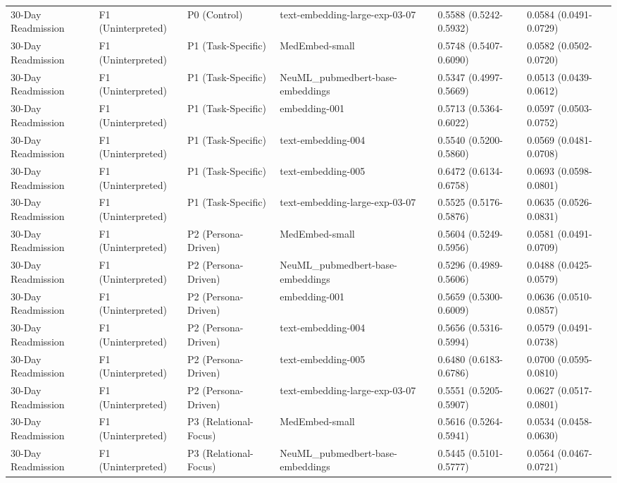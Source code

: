 \documentclass[border=0pt]{standalone}
\begin{document}
\begin{adjustbox}{width=\textwidth}
\begin{tabular}{llllll}
30-Day Readmission & F1 (Uninterpreted) & P0 (Control) & text-embedding-large-exp-03-07 & 0.5588 (0.5242-0.5932) & 0.0584 (0.0491-0.0729) \\
30-Day Readmission & F1 (Uninterpreted) & P1 (Task-Specific) & MedEmbed-small & 0.5748 (0.5407-0.6090) & 0.0582 (0.0502-0.0720) \\
30-Day Readmission & F1 (Uninterpreted) & P1 (Task-Specific) & NeuML\_pubmedbert-base-embeddings & 0.5347 (0.4997-0.5669) & 0.0513 (0.0439-0.0612) \\
30-Day Readmission & F1 (Uninterpreted) & P1 (Task-Specific) & embedding-001 & 0.5713 (0.5364-0.6022) & 0.0597 (0.0503-0.0752) \\
30-Day Readmission & F1 (Uninterpreted) & P1 (Task-Specific) & text-embedding-004 & 0.5540 (0.5200-0.5860) & 0.0569 (0.0481-0.0708) \\
30-Day Readmission & F1 (Uninterpreted) & P1 (Task-Specific) & text-embedding-005 & 0.6472 (0.6134-0.6758) & 0.0693 (0.0598-0.0801) \\
30-Day Readmission & F1 (Uninterpreted) & P1 (Task-Specific) & text-embedding-large-exp-03-07 & 0.5525 (0.5176-0.5876) & 0.0635 (0.0526-0.0831) \\
30-Day Readmission & F1 (Uninterpreted) & P2 (Persona-Driven) & MedEmbed-small & 0.5604 (0.5249-0.5956) & 0.0581 (0.0491-0.0709) \\
30-Day Readmission & F1 (Uninterpreted) & P2 (Persona-Driven) & NeuML\_pubmedbert-base-embeddings & 0.5296 (0.4989-0.5606) & 0.0488 (0.0425-0.0579) \\
30-Day Readmission & F1 (Uninterpreted) & P2 (Persona-Driven) & embedding-001 & 0.5659 (0.5300-0.6009) & 0.0636 (0.0510-0.0857) \\
30-Day Readmission & F1 (Uninterpreted) & P2 (Persona-Driven) & text-embedding-004 & 0.5656 (0.5316-0.5994) & 0.0579 (0.0491-0.0738) \\
30-Day Readmission & F1 (Uninterpreted) & P2 (Persona-Driven) & text-embedding-005 & 0.6480 (0.6183-0.6786) & 0.0700 (0.0595-0.0810) \\
30-Day Readmission & F1 (Uninterpreted) & P2 (Persona-Driven) & text-embedding-large-exp-03-07 & 0.5551 (0.5205-0.5907) & 0.0627 (0.0517-0.0801) \\
30-Day Readmission & F1 (Uninterpreted) & P3 (Relational-Focus) & MedEmbed-small & 0.5616 (0.5264-0.5941) & 0.0534 (0.0458-0.0630) \\
30-Day Readmission & F1 (Uninterpreted) & P3 (Relational-Focus) & NeuML\_pubmedbert-base-embeddings & 0.5445 (0.5101-0.5777) & 0.0564 (0.0467-0.0721) \\

\end{tabular}
\end{adjustbox}
\end{document}
